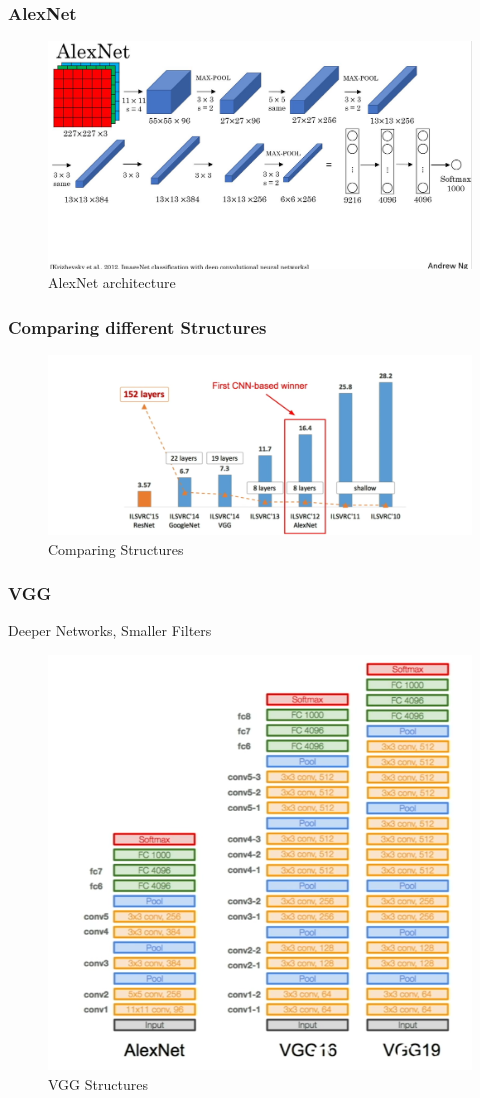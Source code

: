 \documentclass{beamer}
\begin{document}
\begin{frame}
\frametitle{AlexNet}

\begin{figure}
	\includegraphics[width=\linewidth]{Pics/alexnetarch.jpg}
	\caption{AlexNet architecture}
\end{figure}

\end{frame}
\begin{frame}
\frametitle{Comparing different Structures}

\begin{figure}
	\includegraphics[width=\linewidth]{Pics/comaprecnn.png}
	\caption{Comparing Structures}
\end{figure}

\end{frame}
\begin{frame}
\frametitle{VGG}
{\color{red} Deeper Networks, Smaller Filters}
\begin{figure}
	\includegraphics[width=.6\linewidth]{Pics/VGG.png}
	\caption{VGG Structures}
\end{figure}

\end{frame}
\end{document}
